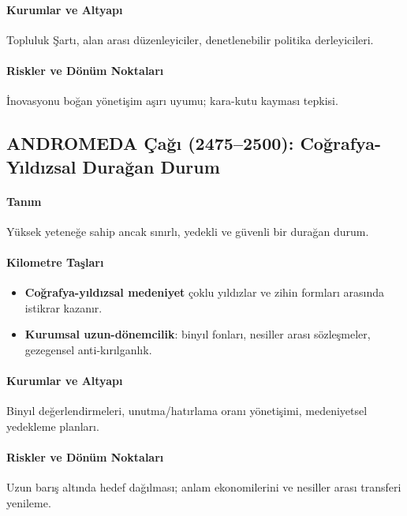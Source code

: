 \documentclass[11pt]{article}
\begin{document}
\begin{itemize}[noitemsep]
\begin{itemize}[noitemsep]
\begin{itemize}[noitemsep]
\begin{itemize}[noitemsep]
\begin{itemize}[noitemsep]
\begin{itemize}[noitemsep]
\begin{itemize}[noitemsep]
\begin{enumerate}[noitemsep]
\begin{itemize}[noitemsep]
\paragraph{Kurumlar ve Altyapı} Topluluk Şartı, alan arası düzenleyiciler, denetlenebilir politika derleyicileri.

\paragraph{Riskler ve Dönüm Noktaları} İnovasyonu boğan yönetişim aşırı uyumu; kara-kutu kayması tepkisi.

\subsection{ANDROMEDA Çağı (2475–2500): Coğrafya-Yıldızsal Durağan Durum}
\paragraph{Tanım} Yüksek yeteneğe sahip ancak sınırlı, yedekli ve güvenli bir durağan durum.

\paragraph{Kilometre Taşları}
\begin{itemize}[noitemsep]
  \item \textbf{Coğrafya-yıldızsal medeniyet} çoklu yıldızlar ve zihin formları arasında istikrar kazanır.
  \item \textbf{Kurumsal uzun-dönemcilik}: binyıl fonları, nesiller arası sözleşmeler, gezegensel anti-kırılganlık.
\end{itemize}

\paragraph{Kurumlar ve Altyapı} Binyıl değerlendirmeleri, unutma/hatırlama oranı yönetişimi, medeniyetsel yedekleme planları.

\paragraph{Riskler ve Dönüm Noktaları} Uzun barış altında hedef dağılması; anlam ekonomilerini ve nesiller arası transferi yenileme.


\end{itemize}
\end{enumerate}
\end{itemize}
\end{itemize}
\end{itemize}
\end{itemize}
\end{itemize}
\end{itemize}
\end{itemize}
\end{document}
